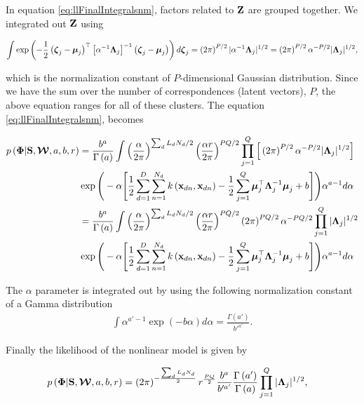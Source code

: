 	In equation \eqref{eq:llFinalIntegralsnm}, factors related to $\boldsymbol{\mathrm{Z}}$ are grouped together. We integrated out $\boldsymbol{\mathrm{Z}}$ using
	
	\begin{align}
	\int \exp\left(-\frac{1}{2}\left(\boldsymbol{\zeta}_j-\boldsymbol{\mu}_j\right)^\top\left[\alpha^{-1}\boldsymbol{\Lambda}_j\right]^{-1}\left(\boldsymbol{\zeta}_j-\boldsymbol{\mu}_j\right)\right)d\boldsymbol{\zeta}_j = \left(2\pi\right)^{P/2}|\alpha^{-1}\boldsymbol{\Lambda}_j|^{1/2} = \left(2\pi\right)^{P/2}\alpha^{-P/2}|\boldsymbol{\Lambda}_j|^{1/2},
	\end{align}
	
	which is the normalization constant of $P$-dimensional Gaussian distribution. Since we have the sum over the number of correspondences (latent vectors), $P$, the above equation ranges for all of these clusters. The equation \eqref{eq:llFinalIntegralsnm}, becomes
	
	\begin{align}
	p\left(\boldsymbol{\Phi}|\mathbf{S},\boldsymbol{\mathcal{W}},a,b,r\right) &=\frac{b^a}{\Gamma\left(a\right)}\int \left(\frac{\alpha}{2\pi}\right)^{\sum_d L_d N_d /2}\left(\frac{\alpha r}{2\pi}\right)^{PQ/2} \prod_{j=1}^{Q}\Big[\left(2\pi\right)^{P/2}\alpha^{-P/2}|\boldsymbol{\Lambda}_j|^{1/2}\Big]
	\notag\\
	&\exp\Bigg(-\alpha\Bigg[\frac{1}{2} \sum_{d=1}^{D}\sum_{n=1}^{N_d}k\left(\mathbf{x}_{dn},\mathbf{x}_{dn}\right) -\frac{1}{2}\sum_{j=1}^{Q}\boldsymbol{\mu}_j^\top\boldsymbol{\Lambda}_j^{-1}\boldsymbol{\mu}_j +b \Bigg]\Bigg)\alpha^{a-1}d\alpha \\
	&=\frac{b^a}{\Gamma\left(a\right)}\int \left(\frac{\alpha}{2\pi}\right)^{\sum_d L_d N_d /2}\left(\frac{\alpha r}{2\pi}\right)^{PQ/2} \left(2\pi\right)^{PQ/2}\alpha^{-PQ/2}\prod_{j=1}^{Q}|\boldsymbol{\Lambda}_j|^{1/2} \notag\\
	&\exp\Bigg(-\alpha\Bigg[\frac{1}{2} \sum_{d=1}^{D}\sum_{n=1}^{N_d}k\left(\mathbf{x}_{dn},\mathbf{x}_{dn}\right) -\frac{1}{2}\sum_{j=1}^{Q}\boldsymbol{\mu}_j^\top\boldsymbol{\Lambda}_j^{-1}\boldsymbol{\mu}_j +b \Bigg]\Bigg)\alpha^{a-1}d\alpha\label{eq:llFinalIntegralZnm}
	\end{align}
	
	The $\alpha$ parameter is integrated out by using the following normalization constant of a Gamma distribution 
	\begin{align}
	\int \alpha^{a'-1}\exp\left(-b\alpha\right)d\alpha = \frac{\Gamma\left(a'\right)}{b'^{a'}}.
	\end{align}
	
	Finally the likelihood of the nonlinear model is given by
	
	\begin{align}
	p\left(\boldsymbol{\Phi}|\mathbf{S},\boldsymbol{\mathcal{W}},a,b,r\right) &=\left(2\pi\right)^{-\frac{\sum_d L_d N_d}{2}}r^{\frac{PQ}{2}}\frac{b^{a}}{b'^{a'}}\frac{\Gamma\left(a'\right)}{\Gamma\left(a\right)}\prod_{j=1}^{Q}|\boldsymbol{\Lambda}_j|^{1/2},
	\label{eq:llFinalIntegrallastnm}
	\end{align}
	
